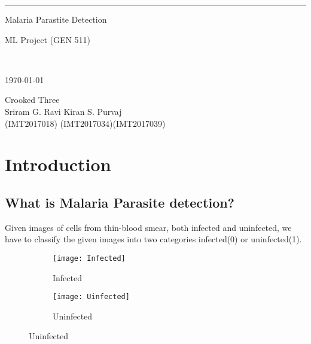 \documentclass{scrreprt}
\date{}
\begin{document}
\begin{flushright}
    \rule{16cm}{5pt}\vskip1cm
    \begin{bfseries}
        \begin{Huge}{Malaria Parastite Detection \\ \begin{large}ML Project (GEN 511)\end{large}\\}\end{Huge}
		\vspace{1.5cm}   
        \today\\
        \vspace{12cm}
        
		\begin{large}
		\begin{center}Crooked Three  \\     
          \vspace{1cm}
         Sriram G.  \hspace{3cm} Ravi Kiran \hspace{3cm} S. Purvaj\\
         (IMT2017018) \hspace{2.25cm}(IMT2017034)\hspace{2cm}(IMT2017039)\\
        \vspace{1.5cm}
		\end{center}
        \end{large}
    \end{bfseries}
\end{flushright}

\tableofcontents




\chapter{Introduction}

\section{What is Malaria Parasite detection? }
Given images of cells from thin-blood smear, both infected and uninfected, we have to classify the given images into two categories infected(0) or uninfected(1).
\begin{figure}[h]

\begin{subfigure}{0.5\textwidth}
\texttt{[image: Infected]}

\caption{Infected}
\end{subfigure}

\begin{subfigure}{0.5\textwidth}
\texttt{[image: Uinfected]}
\caption{Uninfected}
\end{subfigure}

\end{figure}
\end{document}
